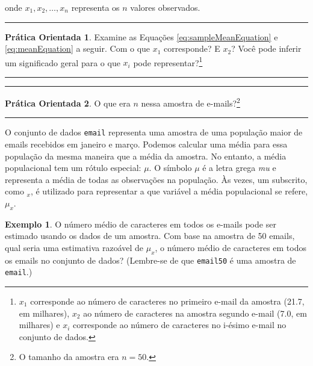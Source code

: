 \documentclass[
]{book}
\theoremstyle{definition}
\theoremstyle{definition}
\newtheorem{example}{Exemplo}[chapter]
\theoremstyle{definition}
\newtheorem{exercise}{Prática Orientada}[chapter]
\theoremstyle{definition}
\theoremstyle{remark}
\begin{document}
onde \(x_1, x_2, \dots, x_n\) representa os \(n\) valores observados.

\begin{center}\rule{0.5\linewidth}{0.5pt}\end{center}

\begin{exercise}
\protect\hypertarget{exr:unnamed-chunk-18}{}{\label{exr:unnamed-chunk-18} }Examine as Equações \eqref{eq:sampleMeanEquation} e \eqref{eq:meanEquation} a seguir. Com o que \(x_1\) corresponde? E \(x_2\)? Você pode inferir um significado geral para o que \(x_i\) pode representar?\footnote{\(x_1\) corresponde ao número de caracteres no primeiro e-mail da amostra (21.7, em milhares), \(x_2\) ao número de caracteres na amostra segundo e-mail (7.0, em milhares) e \(x_i\) corresponde ao número de caracteres no i-ésimo e-mail no conjunto de dados.}
\end{exercise}

\begin{center}\rule{0.5\linewidth}{0.5pt}\end{center}

\begin{center}\rule{0.5\linewidth}{0.5pt}\end{center}

\begin{exercise}
\protect\hypertarget{exr:unnamed-chunk-19}{}{\label{exr:unnamed-chunk-19} }O que era \(n\) nessa amostra de e-mails?\footnote{O tamanho da amostra era \(n=50\).}
\end{exercise}

\begin{center}\rule{0.5\linewidth}{0.5pt}\end{center}

O conjunto de dados \texttt{email} representa uma amostra de uma população maior de emails recebidos em janeiro e março. Podemos calcular uma média para essa população da mesma maneira que a média da amostra. No entanto, a média populacional tem um rótulo especial: \(\mu\). O símbolo \(\mu\) é a letra grega \emph{mu} e representa a média de todas as observações na população. Às vezes, um subscrito, como \(_x\), é utilizado para representar a que variável a média populacional se refere, \(\mu_x\).

\begin{example}
\protect\hypertarget{exm:unnamed-chunk-20}{}{\label{exm:unnamed-chunk-20} }O número médio de caracteres em todos os e-mails pode ser estimado usando os dados de um amostra. Com base na amostra de 50 emails, qual seria uma estimativa razoável de \(\mu_x\), o número médio de caracteres em todos os emails no conjunto de dados? (Lembre-se de que \texttt{email50} é uma amostra de \texttt{email}.)
\end{example}
\end{document}
